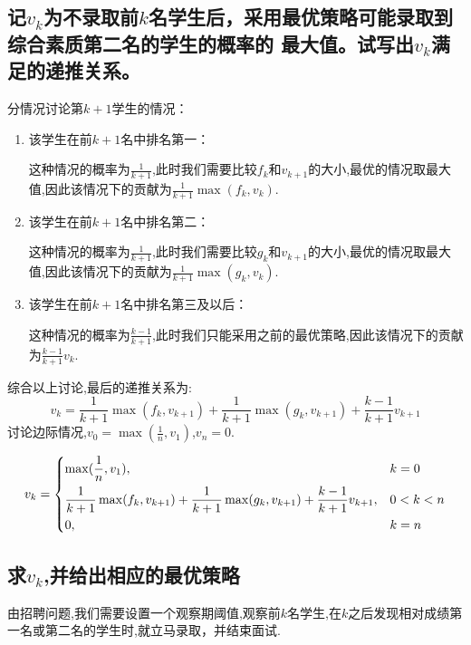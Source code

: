 \documentclass{ctexart}
\begin{document}
\subsection{记$v_k$为不录取前$k$名学生后，采用最优策略可能录取到综合素质第二名的学生的概率的
    最大值。试写出$v_k$满足的递推关系。}
分情况讨论第$k + 1$学生的情况：
\begin{enumerate}
    \item 该学生在前$k + 1$名中排名第一：

          这种情况的概率为$\frac{1}{k + 1}$,此时我们需要比较$f_k$和$v_{k + 1}$的大小,最优的情况取最大值,因此该情况下的贡献为$\frac{1}{k + 1}\max(f_k, v_k)$.
    \item 该学生在前$k + 1$名中排名第二：

          这种情况的概率为$\frac{1}{k + 1}$,此时我们需要比较$g_k$和$v_{k + 1}$的大小,最优的情况取最大值,因此该情况下的贡献为$\frac{1}{k + 1}\max(g_k, v_k)$.

    \item 该学生在前$k + 1$名中排名第三及以后：

          这种情况的概率为$\frac{k - 1}{k + 1}$,此时我们只能采用之前的最优策略,因此该情况下的贡献为$\frac{k - 1}{k + 1}v_k$.
\end{enumerate}
综合以上讨论,最后的递推关系为:
\begin{equation}
    v_{k}=\frac{1}{k + 1}\max(f_k, v_{k + 1})+\frac{1}{k + 1}\max(g_k, v_{k + 1})+\frac{k - 1}{k + 1}v_{k + 1}
\end{equation}
讨论边际情况,$v_0 = \max(\frac{1}{n}, v_1)$,$v_n = 0$.

\begin{equation}
    v_k = \begin{dcases}
        \max(\frac{1}{n}, v_1),                                                                                   & k = 0     \\
        \frac{1}{k + 1}\max(f_k, v_{k + 1}) + \frac{1}{k + 1}\max(g_k, v_{k + 1}) + \frac{k - 1}{k + 1}v_{k + 1}, & 0 < k < n \\
        0,                                                                                                        & k = n
    \end{dcases}
\end{equation}

\subsection{求$v_k$,并给出相应的最优策略}
由招聘问题,我们需要设置一个观察期阈值,观察前$k$名学生,在$k$之后发现相对成绩第一名或第二名的学生时,就立马录取，并结束面试.
\end{document}
